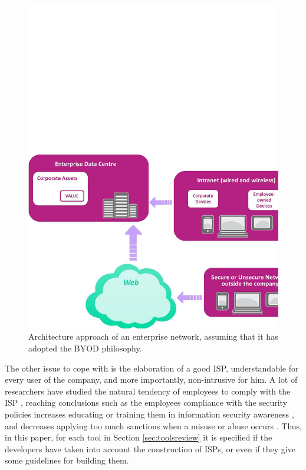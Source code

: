 \begin{figure}
\centering
	\includegraphics[scale =0.4] {gfx/byodSotA/proposedDiagram.pdf}
	\caption{Architecture approach of an enterprise network, assuming that it has adopted the BYOD philosophy.}
	\label{fig:proposed_diagram}
\end{figure}

The other issue to cope with is the elaboration of a good ISP, understandable for every user of the company, and more importantly, non-intrusive for him. A lot of researchers have studied the natural tendency of employees to comply with the ISP \cite{SecPolComp10,SecPolComp12,SecPolComp14}, reaching conclusions such as the employees compliance with the security policies increases educating or training them in information security awareness \cite{SecPolComp09}, and decreases applying too much sanctions when a misuse or abuse occurs \cite{SecPolPenalty09}. Thus, in this paper, for each tool in Section \ref{sec:toolsreview} it is specified if the developers have taken into account the construction of ISPs, or even if they give some guidelines for building them. 

